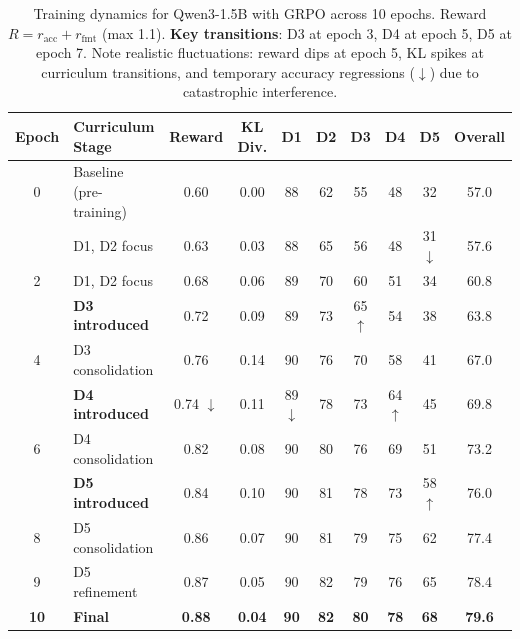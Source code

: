 \documentclass[a4paper,fleqn]{cas-dc}
\theoremstyle{definition}
\begin{document}
\begin{table}[!ht]
\centering
\caption{Training dynamics for Qwen3-1.5B with GRPO across 10 epochs. Reward $R = r_{\text{acc}} + r_{\text{fmt}}$ (max 1.1). \textbf{Key transitions}: D3 at epoch 3, D4 at epoch 5, D5 at epoch 7. Note realistic fluctuations: reward dips at epoch 5, KL spikes at curriculum transitions, and temporary accuracy regressions (\textcolor{red!70!black}{$\downarrow$}) due to catastrophic interference.}
\label{tab:training_dynamics}
\small
\setlength{\tabcolsep}{0pt}
\begin{tabular*}{\textwidth}{@{\extracolsep{\fill}} c l cc ccccc c @{}}
\toprule
\textbf{Epoch} & \textbf{Curriculum Stage} & \textbf{Reward} & \textbf{KL Div.} & \textbf{D1} & \textbf{D2} & \textbf{D3} & \textbf{D4} & \textbf{D5} & \textbf{Overall} \\
\midrule
0 & Baseline (pre-training) & 0.60 & 0.00 & 88 & 62 & 55 & 48 & 32 & 57.0 \\
\addlinespace[0.3em]
1 & D1, D2 focus & 0.63 & 0.03 & 88 & 65 & 56 & 48 & \textcolor{red!70!black}{31 $\downarrow$} & 57.6 \\
2 & D1, D2 focus & 0.68 & 0.06 & 89 & 70 & 60 & 51 & 34 & 60.8 \\
\addlinespace[0.3em]
3 & \textbf{D3 introduced} & 0.72 & 0.09 & 89 & 73 & \textcolor{green!50!black}{65 $\uparrow$} & 54 & 38 & 63.8 \\
4 & D3 consolidation & 0.76 & \textcolor{red!70!black}{0.14} & 90 & 76 & 70 & 58 & 41 & 67.0 \\
\addlinespace[0.3em]
5 & \textbf{D4 introduced} & \textcolor{red!70!black}{0.74 $\downarrow$} & 0.11 & \textcolor{red!70!black}{89 $\downarrow$} & 78 & 73 & \textcolor{green!50!black}{64 $\uparrow$} & 45 & 69.8 \\
6 & D4 consolidation & 0.82 & 0.08 & 90 & 80 & 76 & 69 & 51 & 73.2 \\
\addlinespace[0.3em]
7 & \textbf{D5 introduced} & 0.84 & \textcolor{red!70!black}{0.10} & 90 & 81 & 78 & 73 & \textcolor{green!50!black}{58 $\uparrow$} & 76.0 \\
8 & D5 consolidation & 0.86 & 0.07 & 90 & 81 & 79 & 75 & 62 & 77.4 \\
9 & D5 refinement & 0.87 & 0.05 & 90 & 82 & \textcolor{red!70!black}{79} & 76 & 65 & 78.4 \\
\addlinespace[0.3em]
\textbf{10} & \textbf{Final} & \textbf{0.88} & \textbf{0.04} & \textbf{90} & \textbf{82} & \textbf{80} & \textbf{78} & \textbf{68} & \textbf{79.6} \\
\bottomrule

\end{tabular*}
\end{table}
\end{document}

